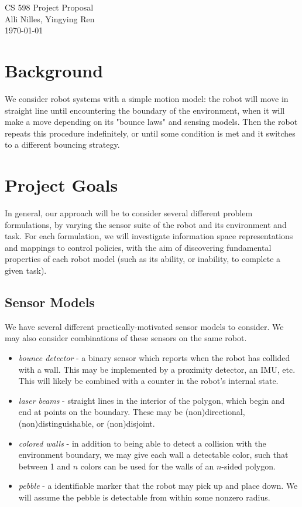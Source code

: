 \documentclass{article}
\theoremstyle{definition}
\theoremstyle{remark}
\begin{document}
\begin{centering}
\large{CS 598 Project Proposal \\ Alli Nilles, Yingying Ren \\ \today \\}
\end{centering}

\section{Background}

We consider robot systems with a simple motion model: the robot will move in straight line until encountering the boundary of the environment, when it will make a move depending on its "bounce laws" and sensing models. Then the robot repeats this procedure indefinitely, or until some condition is met and it switches to a different bouncing strategy.

\section{Project Goals}

In general, our approach will be to consider several different problem formulations, by varying the sensor suite of the robot and its environment and task. For each formulation, we will investigate information space representations and mappings to control policies, with the aim of discovering fundamental properties of each robot model (such as its ability, or inability, to complete a given task).

\subsection{Sensor Models}

We have several different practically-motivated sensor models to consider. We may also consider combinations of these sensors on the same robot.

\begin{itemize}[noitemsep]
    \item \emph{bounce detector} - a binary sensor which reports when the robot has collided with a wall. This may be implemented by a proximity detector, an IMU, etc. This will likely be combined with a counter in the robot's internal state.
    \item \emph{laser beams} - straight lines in the interior of the polygon, which begin and end at points on the boundary. These may be (non)directional, (non)distinguishable, or (non)disjoint.
    \item \emph{colored walls} - in addition to being able to detect a collision with the environment boundary, we may give each wall a detectable color, such that between 1 and $n$ colors can be used for the walls of an $n$-sided polygon.
    \item \emph{pebble} - a identifiable marker that the robot may pick up and place down. We will assume the pebble is detectable from within some nonzero radius.
\end{itemize}
\end{document}
